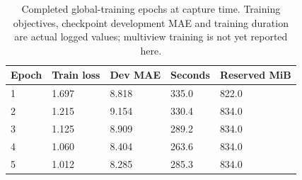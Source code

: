 \begin{table}[!t]
\centering\footnotesize
\caption{Completed global-training epochs at capture time. Training objectives, checkpoint development MAE and training duration are actual logged values; multiview training is not yet reported here.}
\label{tab:prelim_epochs}
\begin{tabularx}{\columnwidth}{@{}p{27mm}XXXX@{}}
\toprule
Epoch & Train loss & Dev MAE & Seconds & Reserved MiB \\
\midrule
1 & 1.697 & 8.818 & 335.0 & 822.0 \\
2 & 1.215 & 9.154 & 330.4 & 834.0 \\
3 & 1.125 & 8.909 & 289.2 & 834.0 \\
4 & 1.060 & 8.404 & 263.6 & 834.0 \\
5 & 1.012 & 8.285 & 285.3 & 834.0 \\
\bottomrule
\end{tabularx}
\end{table}